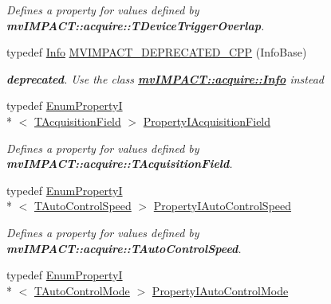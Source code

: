 \begin{DoxyCompactItemize}
\begin{DoxyCompactList}\small\item\em Defines a property for values defined by {\bfseries mv\+I\+M\+P\+A\+C\+T\+::acquire\+::\+T\+Device\+Trigger\+Overlap}. \end{DoxyCompactList}\item 
typedef \hyperlink{classmv_i_m_p_a_c_t_1_1acquire_1_1_info}{Info} \hyperlink{group___common_interface_ga3066c4f348d9374a48618855a5797dc9}{M\+V\+I\+M\+P\+A\+C\+T\+\_\+\+D\+E\+P\+R\+E\+C\+A\+T\+E\+D\+\_\+\+C\+P\+P} (Info\+Base)
\begin{DoxyCompactList}\small\item\em {\bfseries deprecated}. Use the class {\bfseries \hyperlink{classmv_i_m_p_a_c_t_1_1acquire_1_1_info}{mv\+I\+M\+P\+A\+C\+T\+::acquire\+::\+Info}} instead \end{DoxyCompactList}\item 
\hypertarget{group___device_specific_interface_ga01090436ef6969d1fedb45ce24f68d9b}{typedef \hyperlink{classmv_i_m_p_a_c_t_1_1acquire_1_1_enum_property_i}{Enum\+Property\+I}\\*
$<$ \hyperlink{group___device_specific_interface_gac2b87599c04c1ca9aa8c8a412c8a5518}{T\+Acquisition\+Field} $>$ \hyperlink{group___device_specific_interface_ga01090436ef6969d1fedb45ce24f68d9b}{Property\+I\+Acquisition\+Field}}\label{group___device_specific_interface_ga01090436ef6969d1fedb45ce24f68d9b}

\begin{DoxyCompactList}\small\item\em Defines a property for values defined by {\bfseries mv\+I\+M\+P\+A\+C\+T\+::acquire\+::\+T\+Acquisition\+Field}. \end{DoxyCompactList}\item 
\hypertarget{group___device_specific_interface_ga8b56e568f48f677546ec6dc38012e108}{typedef \hyperlink{classmv_i_m_p_a_c_t_1_1acquire_1_1_enum_property_i}{Enum\+Property\+I}\\*
$<$ \hyperlink{group___device_specific_interface_ga363635dbd1401b0d852e9918eba2187f}{T\+Auto\+Control\+Speed} $>$ \hyperlink{group___device_specific_interface_ga8b56e568f48f677546ec6dc38012e108}{Property\+I\+Auto\+Control\+Speed}}\label{group___device_specific_interface_ga8b56e568f48f677546ec6dc38012e108}

\begin{DoxyCompactList}\small\item\em Defines a property for values defined by {\bfseries mv\+I\+M\+P\+A\+C\+T\+::acquire\+::\+T\+Auto\+Control\+Speed}. \end{DoxyCompactList}\item 
\hypertarget{group___device_specific_interface_ga692ee7a4c1a557177eba5b66deed4c2d}{typedef \hyperlink{classmv_i_m_p_a_c_t_1_1acquire_1_1_enum_property_i}{Enum\+Property\+I}\\*
$<$ \hyperlink{group___device_specific_interface_gaa686f613e70c03c31a58674a71fb318d}{T\+Auto\+Control\+Mode} $>$ \hyperlink{group___device_specific_interface_ga692ee7a4c1a557177eba5b66deed4c2d}{Property\+I\+Auto\+Control\+Mode}}\label{group___device_specific_interface_ga692ee7a4c1a557177eba5b66deed4c2d}


\end{DoxyCompactItemize}
